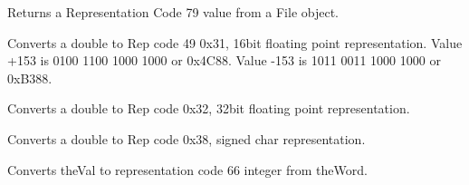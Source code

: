 \documentclass[letterpaper,10pt,english]{sphinxmanual}
\begin{document}

\begin{fulllineitems}
\label{\detokenize{ref/LIS/core/RepCode:TotalDepth.LIS.core.pRepCode.read79}}
Returns a Representation Code 79 value from a File object.

\end{fulllineitems}


\begin{fulllineitems}
\label{\detokenize{ref/LIS/core/RepCode:TotalDepth.LIS.core.pRepCode.to49}}
Converts a double to Rep code 49 0x31, 16bit floating point representation.
Value +153 is 0100 1100 1000 1000 or 0x4C88.
Value -153 is 1011 0011 1000 1000 or 0xB388.

\end{fulllineitems}


\begin{fulllineitems}
\label{\detokenize{ref/LIS/core/RepCode:TotalDepth.LIS.core.pRepCode.to50}}
Converts a double to Rep code 0x32, 32bit floating point representation.

\end{fulllineitems}


\begin{fulllineitems}
\label{\detokenize{ref/LIS/core/RepCode:TotalDepth.LIS.core.pRepCode.to56}}
Converts a double to Rep code 0x38, signed char representation.

\end{fulllineitems}


\begin{fulllineitems}
\label{\detokenize{ref/LIS/core/RepCode:TotalDepth.LIS.core.pRepCode.to66}}
Converts theVal to representation code 66 integer from theWord.

\end{fulllineitems}
\end{document}
